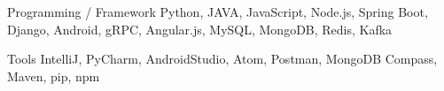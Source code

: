 


\begin{cvskills}


\cvskill
{Programming / Framework} %
{Python, JAVA, JavaScript, Node.js, Spring Boot, Django, Android, gRPC, Angular.js, MySQL, MongoDB, Redis, Kafka} %


\cvskill
{Tools} %
{IntelliJ, PyCharm, AndroidStudio, Atom, Postman, MongoDB Compass, Maven, pip, npm} %



\end{cvskills}
